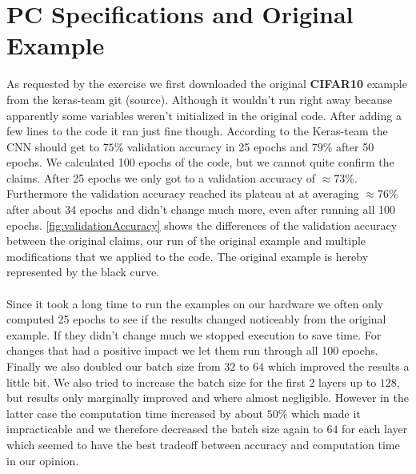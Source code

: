 \documentclass{article}
\begin{document}
	\section{PC Specifications and Original Example}
	\label{sec:PCSpecificationsAndOriginalExample}
	As requested by the exercise we first downloaded the original \textbf{CIFAR10} example from the keras-team git (source). Although it wouldn't run right away because apparently some variables weren't initialized in the original code. After adding a few lines to the code it ran just fine though. According to the Keras-team the CNN should get to $75\%$ validation accuracy in 25 epochs and $79\%$ after 50 epochs. We calculated 100 epochs of the code, but we cannot quite confirm the claims. After 25 epochs we only got to a validation accuracy of $\approx73\%$. Furthermore the validation accuracy reached its plateau at at averaging $\approx76\%$ after about 34 epochs and didn't change much more, even after running all 100 epochs. \autoref{fig:validationAccuracy} shows the differences of the validation accuracy between the original claims, our run of the original example and multiple modifications that we applied to the code. The original example is hereby represented by the black curve. \\
	\\
	Since it took a long time to run the examples on our hardware we often only computed 25 epochs to see if the results changed noticeably from the original example. If they didn't change much we stopped execution to save time. For changes that had a positive impact we let them run through all 100 epochs. 
	Finally we also doubled our batch size from $32$ to $64$ which improved the results a little bit. We also tried to increase the batch size for the first 2 layers up to $128$, but results only marginally improved and where almost negligible. However in the latter case the computation time increased by about $50\%$ which made it impracticable and we therefore decreased the batch size again to $64$ for each layer which seemed to have the best tradeoff between accuracy and computation time in our opinion. 
	
\end{document}
